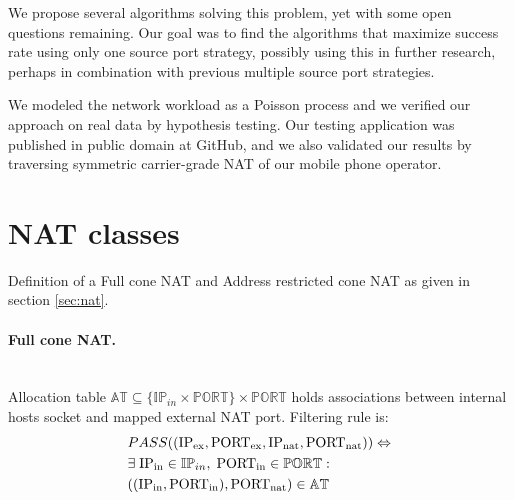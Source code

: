 \documentclass{llncs}
\begin{document}
We propose several algorithms solving this problem, yet with some open questions remaining. 
Our goal was to find the algorithms that maximize success rate using only one source port strategy, possibly using this
in further research, perhaps in combination with previous multiple source port strategies.

We modeled the network workload as a Poisson process and we verified our approach on real data by hypothesis testing.
Our testing application was published in public domain at GitHub, and we also validated our results by traversing symmetric 
carrier-grade NAT of our mobile phone operator.

\appendix
\section{NAT classes}\label{sec:classes_appendix}
Definition of a Full cone NAT and Address restricted cone NAT as given in section \ref{sec:nat}.

\paragraph{Full cone NAT.} ~\\
Allocation table $\mathbb{AT} \subseteq \{ \mathbb{IP}_{in} \times \mathbb{PORT} \} \times \mathbb{PORT}$ holds associations between internal 
hosts socket and mapped external NAT port. 
Filtering rule is:
\begin{align*}
& PASS((\text{IP\textsubscript{ex}}, \text{PORT\textsubscript{ex}}, \text{IP\textsubscript{nat}}, \text{PORT\textsubscript{nat}} )) \Leftrightarrow \\
&  \exists \; \text{IP\textsubscript{in}} \in \mathbb{IP}_{in}, \; \text{PORT\textsubscript{in}} \in \mathbb{PORT}:\\
& ((\text{IP\textsubscript{in}}, \text{PORT\textsubscript{in}}), \text{PORT\textsubscript{nat}} ) \in \mathbb{AT}
\end{align*}
 
\end{document}
